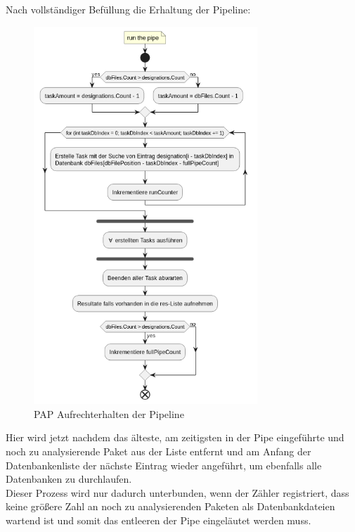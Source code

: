     \newpage
    Nach vollständiger Befüllung die Erhaltung der Pipeline:
    \begin{figure}[H]
        \centering
        \includegraphics[width=0.75\textwidth]{../pap/Case_B_k.png}
        \caption{\ac{PAP} Aufrechterhalten der Pipeline}
        \label{png:case_b}
    \end{figure}
    Hier wird jetzt nachdem das älteste, am zeitigsten in der Pipe eingeführte und noch zu analysierende Paket aus der Liste entfernt und am Anfang der Datenbankenliste der nächste Eintrag wieder angeführt, um ebenfalls alle Datenbanken zu durchlaufen.
    \\
    Dieser Prozess wird nur dadurch unterbunden, wenn der Zähler registriert, dass keine größere Zahl an noch zu analysierenden Paketen als Datenbankdateien wartend ist und somit das entleeren der Pipe eingeläutet werden muss.

